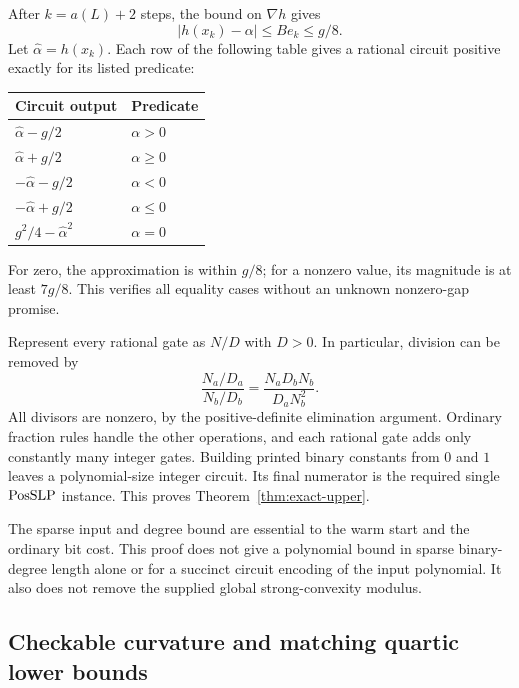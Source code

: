 After $k=a(L)+2$ steps, the bound on $\nabla h$ gives
\[
 |h(x_k)-\alpha|\le B e_k\le g/8.
\]
Let $\widehat\alpha=h(x_k)$. Each row of the following table gives
a rational circuit positive exactly for its listed predicate:
\begin{center}
\begin{tabular}{ll}
\toprule
Circuit output & Predicate\\
\midrule
$\widehat\alpha-g/2$ & $\alpha>0$\\
$\widehat\alpha+g/2$ & $\alpha\ge0$\\
$-\widehat\alpha-g/2$ & $\alpha<0$\\
$-\widehat\alpha+g/2$ & $\alpha\le0$\\
$g^2/4-\widehat\alpha^2$ & $\alpha=0$\\
\bottomrule
\end{tabular}
\end{center}
For zero, the approximation is within $g/8$; for a nonzero value,
its magnitude is at least $7g/8$. This verifies all equality cases
without an unknown nonzero-gap promise.

Represent every rational gate as $N/D$ with $D>0$. In particular,
division can be removed by
\[
 \frac{N_a/D_a}{N_b/D_b}
 =\frac{N_aD_bN_b}{D_aN_b^2}.
\]
All divisors are nonzero, by the positive-definite elimination
argument. Ordinary fraction rules handle the other operations, and
each rational gate adds only constantly many integer gates. Building
printed binary constants from $0$ and $1$ leaves a polynomial-size
integer circuit. Its final numerator is the required single
$\mathrm{PosSLP}$ instance. This proves Theorem~\ref{thm:exact-upper}.

The sparse input and degree bound are essential to the warm start and
the ordinary bit cost. This proof does not give a polynomial bound in
sparse binary-degree length alone or for a succinct circuit encoding
of the input polynomial. It also does not remove the supplied global
strong-convexity modulus.

\subsection{Checkable curvature and matching quartic lower bounds}

